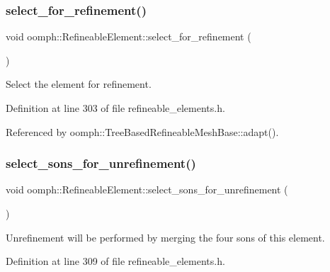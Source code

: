 \subsubsection{\texorpdfstring{select\+\_\+for\+\_\+refinement()}{select\_for\_refinement()}}
{\footnotesize\ttfamily void oomph\+::\+Refineable\+Element\+::select\+\_\+for\+\_\+refinement (\begin{DoxyParamCaption}{ }\end{DoxyParamCaption})\hspace{0.3cm}{\ttfamily [inline]}}



Select the element for refinement. 



Definition at line 303 of file refineable\+\_\+elements.\+h.



Referenced by oomph\+::\+Tree\+Based\+Refineable\+Mesh\+Base\+::adapt().

\mbox{\label{classoomph_1_1RefineableElement_a0f756235a17399d9175e05b29efed292}} 
\subsubsection{\texorpdfstring{select\+\_\+sons\+\_\+for\+\_\+unrefinement()}{select\_sons\_for\_unrefinement()}}
{\footnotesize\ttfamily void oomph\+::\+Refineable\+Element\+::select\+\_\+sons\+\_\+for\+\_\+unrefinement (\begin{DoxyParamCaption}{ }\end{DoxyParamCaption})\hspace{0.3cm}{\ttfamily [inline]}}



Unrefinement will be performed by merging the four sons of this element. 



Definition at line 309 of file refineable\+\_\+elements.\+h.

\mbox{\label{classoomph_1_1RefineableElement_a01c12f1b800cfc4176bf218bb73c7f14}} 
